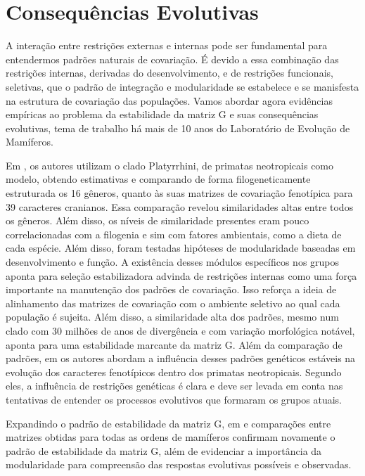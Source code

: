 \section{Consequências Evolutivas}\label{intro:consequencias}

A interação entre restrições externas e internas pode ser fundamental
para entendermos padrões naturais de covariação.
É devido a essa combinação das restrições internas, derivadas do
desenvolvimento, e de restrições funcionais, seletivas, que o padrão de
integração e modularidade se estabelece e se manisfesta na estrutura de
covariação das populações.
Vamos abordar agora evidências empíricas ao problema da estabilidade da
matriz G e suas consequências evolutivas, tema de trabalho há mais de 10
anos do Laboratório de Evolução de Mamíferos.

Em \cite{Marroig2001}, os autores utilizam o clado Platyrrhini, de
primatas neotropicais como modelo, obtendo estimativas e comparando de
forma filogeneticamente estruturada os 16 gêneros, quanto às suas
matrizes de covariação fenotípica para 39 caracteres cranianos.
Essa comparação revelou similaridades altas entre todos os gêneros.
Além disso, os níveis de similaridade presentes eram pouco
correlacionadas com a filogenia e sim com fatores ambientais, como a
dieta de cada espécie.
Além disso, foram testadas hipóteses de modularidade baseadas em
desenvolvimento e função.
A existência desses módulos específicos nos grupos aponta para
seleção estabilizadora advinda de restrições internas como uma força
importante na manutenção dos padrões de covariação.
Isso reforça a ideia de alinhamento das matrizes de covariação com o
ambiente seletivo ao qual cada população é sujeita.
Além disso, a similaridade alta dos padrões, mesmo num clado com 30
milhões de anos de divergência e com variação morfológica notável,
aponta para uma estabilidade marcante da matriz G.
Além da comparação de padrões, em \cite{Marroig2005, Marroig2010} os
autores abordam a influência desses padrões genéticos estáveis na
evolução dos caracteres fenotípicos dentro dos primatas neotropicais.
Segundo eles, a influência de restrições genéticas é clara e deve ser
levada em conta nas tentativas de entender os processos evolutivos que
formaram os grupos atuais.

Expandindo o padrão de estabilidade da matriz G, em \cite{Porto2009} e
\cite{Marroig2009} comparações entre matrizes obtidas para todas as
ordens de mamíferos confirmam novamente o padrão de estabilidade da matriz
G, além de evidenciar a importância da modularidade para compreensão das
respostas evolutivas possíveis e observadas.

